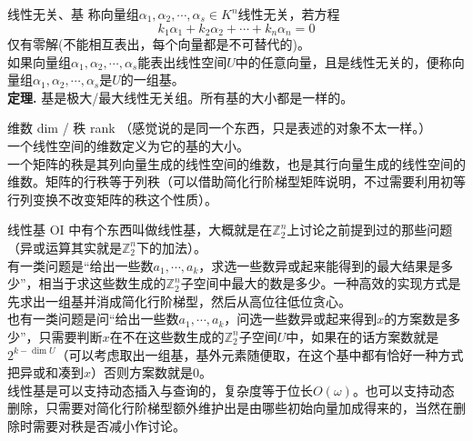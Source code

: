 \documentclass{beamer}
\begin{document}
\begin{frame}{线性无关、基}
	称向量组$\alpha_1, \alpha_2, \cdots, \alpha_s \in K^n$线性无关，若方程$$k_1\alpha_1 + k_2\alpha_2 + \cdots + k_n\alpha_n = 0$$仅有零解(不能相互表出，每个向量都是不可替代的)。\\
	
	如果向量组$\alpha_1, \alpha_2, \cdots, \alpha_s$能表出线性空间$U$中的任意向量，且是线性无关的，便称向量组$\alpha_1, \alpha_2, \cdots, \alpha_s$是$U$的一组基。\\
	
	\textbf{定理. }基是极大/最大线性无关组。所有基的大小都是一样的。
\end{frame}
\begin{frame}{维数 dim / 秩 rank}
	（感觉说的是同一个东西，只是表述的对象不太一样。）\\
	
	一个线性空间的维数定义为它的基的大小。\\
	
	一个矩阵的秩是其列向量生成的线性空间的维数，也是其行向量生成的线性空间的维数。矩阵的行秩等于列秩（可以借助简化行阶梯型矩阵说明，不过需要利用初等行列变换不改变矩阵的秩这个性质）。\\
	
\end{frame}

\begin{frame}{线性基}
	OI 中有个东西叫做线性基，大概就是在$\mathbb Z_2^n$上讨论之前提到过的那些问题（异或运算其实就是$\mathbb Z_2^n$下的加法）。\\
	
	有一类问题是“给出一些数$a_1, \cdots, a_k$，求选一些数异或起来能得到的最大结果是多少”，相当于求这些数生成的$\mathbb Z_2^n$子空间中最大的数是多少。一种高效的实现方式是先求出一组基并消成简化行阶梯型，然后从高位往低位贪心。\\
	
	也有一类问题是问“给出一些数$a_1, \cdots, a_k$，问选一些数异或起来得到$x$的方案数是多少”，只需要判断$x$在不在这些数生成的$\mathbb Z_2^n$子空间$U$中，如果在的话方案数就是$2^{k - \dim U}$（可以考虑取出一组基，基外元素随便取，在这个基中都有恰好一种方式把异或和凑到$x$）否则方案数就是$0$。\\
	
	线性基是可以支持动态插入与查询的，复杂度等于位长$O(\omega)$。也可以支持动态删除，只需要对简化行阶梯型额外维护出是由哪些初始向量加成得来的，当然在删除时需要对秩是否减小作讨论。
	
\end{frame}
\end{document}
